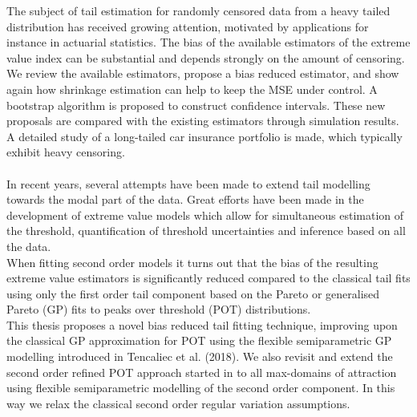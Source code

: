 The subject of tail estimation for randomly censored data from a heavy tailed distribution has received growing attention, motivated by applications for instance in actuarial statistics. The bias of the available estimators of the extreme value index can be substantial and depends strongly on the amount of censoring. We review the available estimators, propose a bias reduced estimator, and show again how shrinkage estimation can help to keep the MSE under control. A bootstrap algorithm is proposed to construct confidence intervals. These new proposals are compared with the existing estimators through simulation results. A detailed study of a long-tailed car insurance portfolio is made, which typically exhibit heavy censoring.
\\\\
In recent years, several attempts have been made to extend tail modelling towards the modal part of the data. Great efforts have been made in the development of extreme value models which allow for simultaneous estimation of the threshold, quantification of threshold uncertainties and inference based on all the data. 
\\
When fitting second order models it turns out that the bias of the resulting extreme value estimators is significantly reduced compared to the classical tail fits using only the first order tail component based on the Pareto or generalised Pareto (GP) fits to peaks over threshold (POT) distributions. 
\\
This thesis proposes a novel bias reduced tail fitting technique, improving upon the classical GP approximation for POT using the flexible semiparametric GP modelling introduced in Tencaliec et al. (2018). We also revisit and extend the second order refined POT approach started in \cite{beirlant2009second} to all max-domains of attraction using flexible semiparametric modelling of the second order component. In this way we relax the classical second order regular variation assumptions.

\newpage
